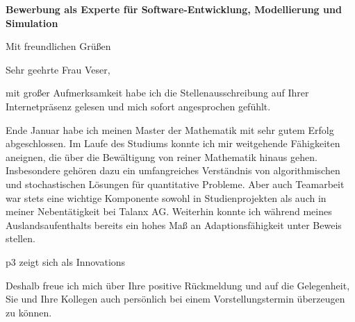 \documentclass[11pt,a4paper,sans]{moderncv}        %
\date{26. März 2018}
\begin{document}

\opening{{\bfseries Bewerbung als Experte für Software-Entwicklung, Modellierung und Simulation}}
\closing{Mit freundlichen Grüßen}
\makelettertitle

Sehr geehrte Frau Veser,
\begin{justify}mit großer Aufmerksamkeit habe ich die Stellenausschreibung auf Ihrer Internetpräsenz gelesen und mich sofort angesprochen gefühlt. 
	
	Ende Januar habe ich meinen Master der Mathematik mit sehr gutem Erfolg abgeschlossen.
	Im Laufe des Studiums konnte ich mir weitgehende Fähigkeiten aneignen, die über die Bewältigung von reiner Mathematik hinaus gehen.
	Insbesondere gehören dazu ein umfangreiches Verständnis von algorithmischen und stochastischen Lösungen für quantitative Probleme.
	Aber auch Teamarbeit war stets eine wichtige Komponente sowohl in Studienprojekten als auch in meiner Nebentätigkeit bei Talanx AG. 
	Weiterhin konnte ich während meines Auslandsaufenthalts bereits ein hohes Maß an Adaptionsfähigkeit unter Beweis stellen.
	
	p3 zeigt sich als Innovations 
	
	Deshalb freue ich mich über Ihre positive Rückmeldung und auf die Gelegenheit, Sie und Ihre Kollegen auch persönlich bei einem Vorstellungstermin überzeugen zu können.
\end{justify}

\makeletterclosing
\clearpage
\makecvtitle
\end{document}
